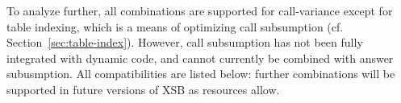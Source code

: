 To analyze further, all combinations are supported for call-variance
except for table indexing, which is a means of optimizing call
subsumption (cf. Section~\ref{sec:table-index}).
However, call subsumption has not been fully integrated with dynamic
code,
and cannot currently be combined
with answer subusmption.
All compatibilities are listed below: further combinations will be
supported in future versions of XSB as resources allow.



